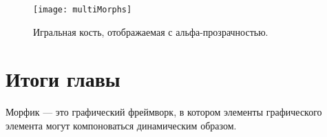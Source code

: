 \documentclass[a4paper,10pt,twoside]{book}
\begin{document}
\begin{figure}[ht]
	\centerline{\texttt{[image: multiMorphs]}}
	\caption{Игральная кость, отображаемая с альфа-прозрачностью.
		}
\end{figure}





\section{Итоги главы}

Морфик --- это графический фреймворк, в котором элементы графического элемента могут компоноваться динамическим образом.
\end{document}
